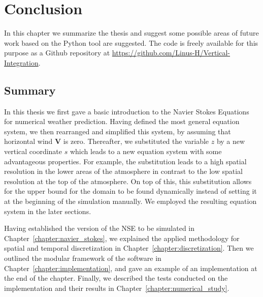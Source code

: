 
\chapter{Conclusion}\label{chapter:conclusion}
In this chapter we summarize the thesis and suggest some possible areas of future work based on the Python tool are suggested.
The code is freely available for this purpose as a Github repository at \url{https://github.com/Linus-H/Vertical-Integration}.

\section{Summary}
In this thesis we first gave a basic introduction to the Navier Stokes Equations for numerical weather prediction.
Having defined the most general equation system, we then rearranged and simplified this system, by assuming that horizontal wind $\textbf{V}$ is zero.
Thereafter, we substituted the variable $z$ by a new vertical coordinate $s$ which leads to a new equation system with some advantageous properties.
For example, the substitution leads to a high spatial resolution in the lower areas of the atmosphere in contrast to the low spatial resolution at the top of the atmosphere.
On top of this, this substitution allows for the upper bound for the domain to be found dynamically instead of setting it at the beginning of the simulation manually.
We employed the resulting equation system in the later sections.

Having established the version of the NSE to be simulated in Chapter~\ref{chapter:navier_stokes}, we explained the applied methodology for spatial and temporal discretization in Chapter~\ref{chapter:discretization}.
Then we outlined the modular framework of the software in Chapter~\ref{chapter:implementation}, and gave an example of an implementation at the end of the chapter.
Finally, we described the tests conducted on the implementation and their results in Chapter~\ref{chapter:numerical_study}.


